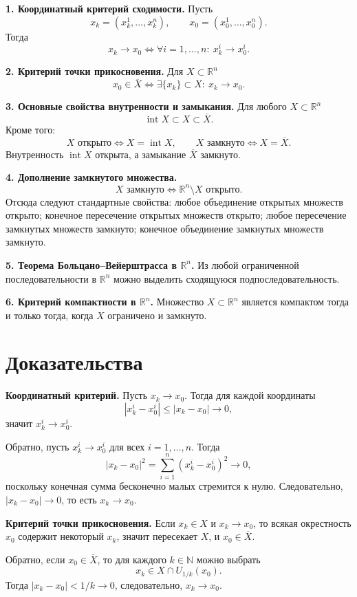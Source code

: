 \documentclass[12pt,a4paper]{article}
\newcommand{\R}{\mathbb{R}}
\newcommand{\Ball}[2]{U_{#1}(#2)}
\begin{document}
\textbf{1. Координатный критерий сходимости.}
Пусть
\[
  x_k=(x_k^1,\dots,x_k^n), \qquad x_0=(x_0^1,\dots,x_0^n).
\]
Тогда
\[
  x_k\to x_0
  \Longleftrightarrow
  \forall i=1,\dots,n:\ x_k^i\to x_0^i.
\]

\textbf{2. Критерий точки прикосновения.}
Для \(X\subset\R^n\)
\[
  x_0\in\overline X
  \Longleftrightarrow
  \exists\{x_k\}\subset X:\ x_k\to x_0.
\]

\textbf{3. Основные свойства внутренности и замыкания.}
Для любого \(X\subset\R^n\)
\[
  \operatorname{int}X\subset X\subset\overline X.
\]
Кроме того:
\[
  X\text{ открыто}\Longleftrightarrow X=\operatorname{int}X,\qquad
  X\text{ замкнуто}\Longleftrightarrow X=\overline X.
\]
Внутренность \(\operatorname{int}X\) открыта, а замыкание \(\overline X\)
замкнуто.

\textbf{4. Дополнение замкнутого множества.}
\[
  X\text{ замкнуто}\Longleftrightarrow \R^n\setminus X\text{ открыто}.
\]
Отсюда следуют стандартные свойства: любое объединение открытых множеств
открыто; конечное пересечение открытых множеств открыто; любое пересечение
замкнутых множеств замкнуто; конечное объединение замкнутых множеств
замкнуто.

\textbf{5. Теорема Больцано--Вейерштрасса в \(\R^n\).}
Из любой ограниченной последовательности в \(\R^n\) можно выделить сходящуюся
подпоследовательность.

\textbf{6. Критерий компактности в \(\R^n\).}
Множество \(X\subset\R^n\) является компактом тогда и только тогда, когда
\(X\) ограничено и замкнуто.

\section*{Доказательства}

\textbf{Координатный критерий.}
Пусть \(x_k\to x_0\). Тогда для каждой координаты
\[
  |x_k^i-x_0^i|\le |x_k-x_0|\to 0,
\]
значит \(x_k^i\to x_0^i\).

Обратно, пусть \(x_k^i\to x_0^i\) для всех \(i=1,\dots,n\). Тогда
\[
  |x_k-x_0|^2
  =\sum_{i=1}^n (x_k^i-x_0^i)^2 \to 0,
\]
поскольку конечная сумма бесконечно малых стремится к нулю. Следовательно,
\(|x_k-x_0|\to0\), то есть \(x_k\to x_0\).

\textbf{Критерий точки прикосновения.}
Если \(x_k\in X\) и \(x_k\to x_0\), то всякая окрестность \(x_0\) содержит
некоторый \(x_k\), значит пересекает \(X\), и \(x_0\in\overline X\).

Обратно, если \(x_0\in\overline X\), то для каждого \(k\in\mathbb N\) можно
выбрать
\[
  x_k\in X\cap\Ball{1/k}{x_0}.
\]
Тогда \(|x_k-x_0|<1/k\to0\), следовательно, \(x_k\to x_0\).
\end{document}
